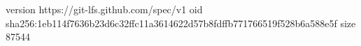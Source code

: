version https://git-lfs.github.com/spec/v1
oid sha256:1eb114f7636b23d6c32ffc11a3614622d57b8fdffb771766519f528b6a588e5f
size 87544
